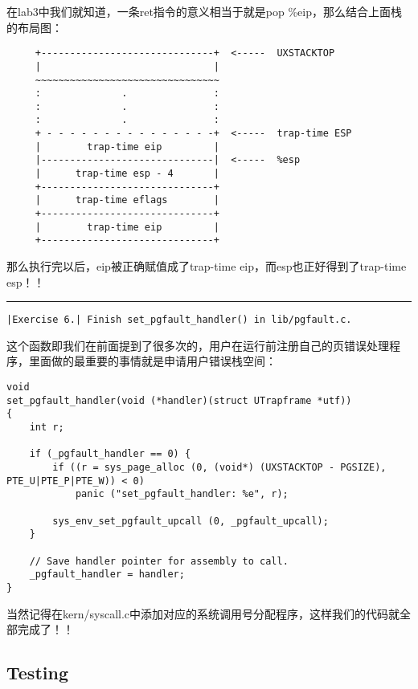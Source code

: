 \documentclass{article}
\begin{document}
\begin{CJK*}{UTF8}{gkai}
\begin{enumerate}
{在lab3中我们就知道，一条ret指令的意义相当于就是pop \%eip，那么结合上面栈的布局图：

{\scriptsize \bfseries
\begin{verbatim}
     +------------------------------+  <-----  UXSTACKTOP
     |                              | 
     ~~~~~~~~~~~~~~~~~~~~~~~~~~~~~~~~
     :              .               :
     :              .               :
     :              .               :
     + - - - - - - - - - - - - - - -+  <-----  trap-time ESP
     |        trap-time eip         |
     |------------------------------|  <-----  %esp  
     |      trap-time esp - 4       | 
     +------------------------------+ 
     |      trap-time eflags        |
     +------------------------------+ 
     |        trap-time eip         |
     +------------------------------+ 
\end{verbatim}
}

那么执行完以后，eip被正确赋值成了trap-time eip，而esp也正好得到了trap-time esp！！

}
\end{enumerate}

\vspace{2em}
\hrule
\vspace{2em}

\begin{lstlisting}[style=exercise]
|Exercise 6.| Finish set_pgfault_handler() in lib/pgfault.c.
\end{lstlisting}

这个函数即我们在前面提到了很多次的，用户在运行前注册自己的页错误处理程序，里面做的最重要的事情就是申请用户错误栈空间：

\begin{lstlisting}[style=ccode, title={\scriptsize \ttfamily \bfseries lib/pgfault.c}]
void
set_pgfault_handler(void (*handler)(struct UTrapframe *utf))
{
    int r;

    if (_pgfault_handler == 0) {
        if ((r = sys_page_alloc (0, (void*) (UXSTACKTOP - PGSIZE), PTE_U|PTE_P|PTE_W)) < 0)
            panic ("set_pgfault_handler: %e", r);

        sys_env_set_pgfault_upcall (0, _pgfault_upcall);
    }

    // Save handler pointer for assembly to call.
    _pgfault_handler = handler;
}
\end{lstlisting}

当然记得在kern/syscall.c中添加对应的系统调用号分配程序，这样我们的代码就全部完成了！！


\subsection{Testing}


\end{CJK*}
\end{document}
